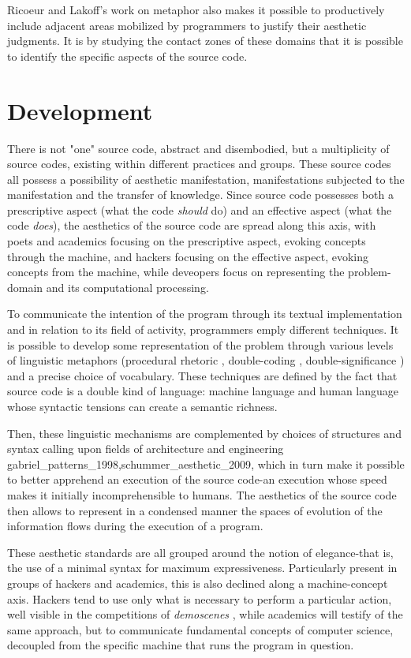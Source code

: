 \documentclass{article}
\begin{document}
Ricoeur and Lakoff's work on metaphor also makes it possible to productively include adjacent areas mobilized by programmers to justify their aesthetic judgments. It is by studying the contact zones of these domains that it is possible to identify the specific aspects of the source code.

\section{Development}

There is not "one" source code, abstract and disembodied, but a multiplicity of source codes, existing within different practices and groups. These source codes all possess a possibility of aesthetic manifestation, manifestations subjected to the manifestation and the transfer of knowledge. Since source code possesses both a prescriptive aspect (what the code \emph{should} do) and an effective aspect (what the code \emph{does}), the aesthetics of the source code are spread along this axis, with poets and academics focusing on the prescriptive aspect, evoking concepts through the machine, and hackers focusing on the effective aspect, evoking concepts from the machine, while deveopers focus on representing the problem-domain and its computational processing.

To communicate the intention of the program through its textual implementation and in relation to its field of activity, programmers emply different techniques. It is possible to develop some representation of the problem through various levels of linguistic metaphors (procedural rhetoric \citep{bogost_rhetoric_2008}, double-coding \citep{cox_speaking_2013}, double-significance \citep{paloque-berges_poetique_2009}) and a precise choice of vocabulary. These techniques are defined by the fact that source code is a double kind of language: machine language and human language whose syntactic tensions can create a semantic richness.

Then, these linguistic mechanisms are complemented by choices of structures and syntax calling upon fields of architecture and engineering {gabriel_patterns_1998,schummer_aesthetic_2009}, which in turn make it possible to better apprehend an execution of the source code-an execution whose speed makes it initially incomprehensible to humans. The aesthetics of the source code then allows to represent in a condensed manner the spaces of evolution of the information flows during the execution of a program.

These aesthetic standards are all grouped around the notion of elegance-that is, the use of a minimal syntax for maximum expressiveness. Particularly present in groups of hackers and academics, this is also declined along a machine-concept axis. Hackers tend to use only what is necessary to perform a particular action, well visible in the competitions of \emph{demoscenes} \citep{kudra_aoc_2020}, while academics will testify of the same approach, but to communicate fundamental concepts of computer science, decoupled from the specific machine that runs the program in question.
\end{document}
